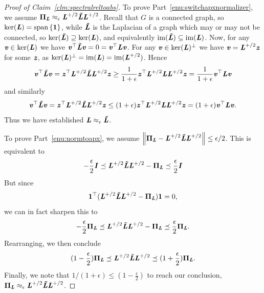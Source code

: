 \begin{proof}[Proof of Claim~\ref{clm:spectralreltoabs}]
  To prove Part~\ref{enu:switchapxnormalizer}, we
  assume $\PPi_{\LL} \approx_{\epsilon}
  \LL^{\pinv/2}\LLtil\LL^{\pinv/2}$.
  Recall that $G$ is a connected graph, so $\ker(\LL) =
  \Span\setof{\vecone}$, while $\LLtil$ is the Laplacian of a graph
which may or may not be connected, so $\ker(\LLtil) \supseteq
\ker(\LL)$, and equivalently $\im(\LLtil) \subseteq \im(\LL)$.
  Now, for any $\vv \in \ker(\LL)$ we have
  $\vv^{\trp} \LLtil \vv = 0 = \vv^{\trp} \LL \vv$.
  For any $\vv \in \ker(\LL)^{\perp}$ we have
  $\vv = \LL^{\pinv/2} \zz$ for some $\zz$, as $\ker(\LL)^{\perp} =
  \im(\LL) = \im(\LL^{\pinv/2})$.
  Hence
  \[
    \vv^{\trp} \LLtil \vv =
    \zz^{\trp} \LL^{\pinv/2}\LLtil\LL^{\pinv/2} \zz
    \geq
    \frac{1}{1+\epsilon}
     \zz^{\trp} \LL^{\pinv/2}\LL\LL^{\pinv/2} \zz
     =
     \frac{1}{1+\epsilon}
     \vv^{\trp} \LL \vv
   \]
and similarly
    \[
    \vv^{\trp} \LLtil \vv =
    \zz^{\trp} \LL^{\pinv/2}\LLtil\LL^{\pinv/2} \zz
    \leq
    (1+\epsilon)
     \zz^{\trp} \LL^{\pinv/2}\LL\LL^{\pinv/2} \zz
     =
    (1+\epsilon)
    \vv^{\trp} \LL \vv
    .
  \]
  Thus we have established  $\LL \approx_{\epsilon} \LLtil$.



  To prove Part~\ref{enu:normtoapx}, we assume $\norm{\PPi_{\LL} - \LL^{\pinv/2}\LLtil\LL^{\pinv/2}} \leq
  \epsilon/2$.
  This is equivalent to
  \[
   - \frac{\epsilon}{2} \II \preceq
    \LL^{\pinv/2}\LLtil\LL^{\pinv/2} - \PPi_{\LL} \preceq \frac{\epsilon}{2} \II
    \]
 But since
  \[
    \vecone^{\trp} (\LL^{\pinv/2}\LLtil\LL^{\pinv/2} - \PPi_{\LL})
    \vecone = 0,
  \]
  we can in fact sharpen this to
    \[
      - \frac{\epsilon}{2} \PPi_{\LL}
      \preceq
      \LL^{\pinv/2}\LLtil\LL^{\pinv/2} - \PPi_{\LL}
      \preceq
    \frac{\epsilon}{2} \PPi_{\LL}
    .
    \]
 Rearranging, we then conclude
 \[
   (1-\frac{\epsilon}{2}) \PPi_{\LL}
   \preceq
   \LL^{\pinv/2}\LLtil\LL^{\pinv/2}
    \preceq
    (1+\frac{\epsilon}{2}) \PPi_{\LL}
    .
  \]
Finally, we note that $1/(1+\epsilon) \leq (1-\frac{\epsilon}{2})$ to
reach our conclusion, $\PPi_{\LL} \approx_{\epsilon} \LL^{\pinv/2}\LLtil\LL^{\pinv/2}$.
\end{proof}


